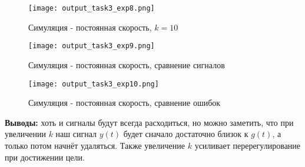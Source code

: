 \begin{figure}[ht]
  \centering
  \texttt{[image: output\_task3\_exp8.png]}
\caption{Симуляция - постоянная скорость, $k=10$}
\end{figure}

\newpage
\begin{figure}[ht]
  \centering
  \texttt{[image: output\_task3\_exp9.png]}
\caption{Симуляция - постоянная скорость, сравнение сигналов}
\end{figure}

\begin{figure}[ht]
  \centering
  \texttt{[image: output\_task3\_exp10.png]}
\caption{Симуляция - постоянная скорость, сравнение ошибок}
\end{figure}

\newpage
\textbf{Выводы:} хоть и сигналы будут всегда расходиться, но можно заметить, что при увеличении $k$ наш сигнал $y(t)$ будет сначало достаточно близок к $g(t)$, а только потом начнёт удаляться.
Также увеличение $k$ усиливает перерегулирование при достижении цели.

\endinput